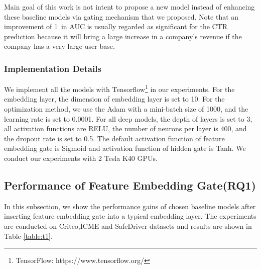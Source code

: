 \documentclass[sigconf,nonacm=true]{acmart}
\begin{document}
Main goal of this work is not intent to propose a new model instead of enhancing these baseline models via gating mechanism that we proposed.
\noindent Note that an improvement of 1\textperthousand\ in AUC is usually regarded as
significant for the CTR prediction because it will bring a large
increase in a company's revenue if the company has a very large user base.

\subsubsection{Implementation Details}
\label{sec:414}
We implement all the models with Tensorflow\footnote{TensorFlow:
  https://www.tensorflow.org/} in our experiments. For the embedding
layer, the dimension of embedding layer is set to 10. For the optimization method, we use the Adam\cite{kingma2014adam} with a mini-batch size of 1000, and the learning rate is set to 0.0001. For all deep models, the depth of layers is set to 3, all activation functions are RELU, the number of neurons per layer
is 400, and the dropout rate is set to 0.5.
The default activation function of feature embedding gate is Sigmoid and activation function of hidden gate is Tanh.    
We conduct our experiments with 2 Tesla K40 GPUs.

\subsection{Performance of Feature Embedding Gate(RQ1)}
\label{sec:s42}
In this subsection, we show the performance gains of chosen baseline models after inserting feature embedding gate into a typical embedding layer. The experiments are conducted on Criteo,ICME and SafeDriver datasets and results are shown in Table \ref{table:t1}.
  
\end{document}
